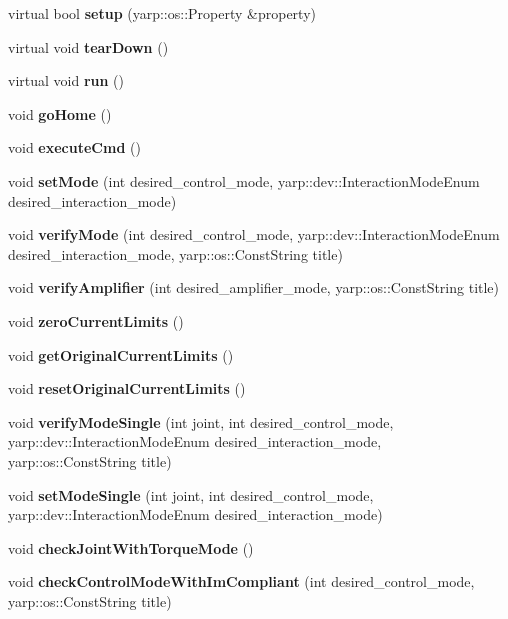 \begin{DoxyCompactItemize}
\item 
\label{classControlModes_a906098cdeee49ee608ec27e14d17fe4a} 
virtual bool {\bfseries setup} (yarp\+::os\+::\+Property \&property)
\item 
\label{classControlModes_a96e49aa347dc1a743e5f506672f72dc5} 
virtual void {\bfseries tear\+Down} ()
\item 
\label{classControlModes_ae438acaf6677471f962d3d6eec430b52} 
virtual void {\bfseries run} ()
\item 
\label{classControlModes_aba99419a0f329ef8db34b3247c9e8461} 
void {\bfseries go\+Home} ()
\item 
\label{classControlModes_a499fb7c42dc501895e41fb8e7922f3fb} 
void {\bfseries execute\+Cmd} ()
\item 
\label{classControlModes_a2db54b3f482b49317a73caffba85fe98} 
void {\bfseries set\+Mode} (int desired\+\_\+control\+\_\+mode, yarp\+::dev\+::\+Interaction\+Mode\+Enum desired\+\_\+interaction\+\_\+mode)
\item 
\label{classControlModes_a79dc3f6647b41b2b1047e0fb769930db} 
void {\bfseries verify\+Mode} (int desired\+\_\+control\+\_\+mode, yarp\+::dev\+::\+Interaction\+Mode\+Enum desired\+\_\+interaction\+\_\+mode, yarp\+::os\+::\+Const\+String title)
\item 
\label{classControlModes_ac4b07380ed5ef4d060320db5e27cefd5} 
void {\bfseries verify\+Amplifier} (int desired\+\_\+amplifier\+\_\+mode, yarp\+::os\+::\+Const\+String title)
\item 
\label{classControlModes_af8d034ed81bad265bef55868c93dccbb} 
void {\bfseries zero\+Current\+Limits} ()
\item 
\label{classControlModes_a07b40de5590b6de6465275f120cc0278} 
void {\bfseries get\+Original\+Current\+Limits} ()
\item 
\label{classControlModes_a4829a8e1d1d0a9bc97d6f99a39f200fb} 
void {\bfseries reset\+Original\+Current\+Limits} ()
\item 
\label{classControlModes_a484beacf0d13cdea8a6e2f42886a151e} 
void {\bfseries verify\+Mode\+Single} (int joint, int desired\+\_\+control\+\_\+mode, yarp\+::dev\+::\+Interaction\+Mode\+Enum desired\+\_\+interaction\+\_\+mode, yarp\+::os\+::\+Const\+String title)
\item 
\label{classControlModes_af9a2fe5d8cdeba9c6a4c6419b7e10c26} 
void {\bfseries set\+Mode\+Single} (int joint, int desired\+\_\+control\+\_\+mode, yarp\+::dev\+::\+Interaction\+Mode\+Enum desired\+\_\+interaction\+\_\+mode)
\item 
\label{classControlModes_a5a886c22a344441ff40d7223b1a9b7aa} 
void {\bfseries check\+Joint\+With\+Torque\+Mode} ()
\item 
\label{classControlModes_ae0706d70e86af67fbff3d01e58e6cb86} 
void {\bfseries check\+Control\+Mode\+With\+Im\+Compliant} (int desired\+\_\+control\+\_\+mode, yarp\+::os\+::\+Const\+String title)
\end{DoxyCompactItemize}


